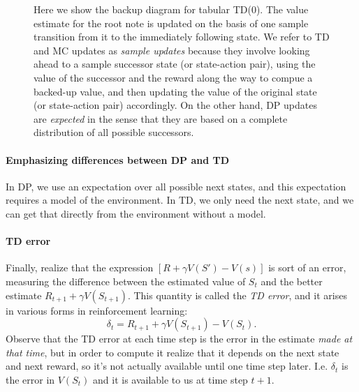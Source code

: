 \documentclass[12pt]{article}
\begin{document}
\begin{figure}[h]
  \centering
  \caption{\footnotesize Here we show the backup diagram for tabular TD(0). The value estimate for the root note is updated on the basis of one sample transition from it to the immediately following state. We refer to TD and MC updates as \emph{sample updates} because they involve looking ahead to a sample successor state (or state-action pair), using the value of the successor and the reward along the way to compue a backed-up value, and then updating the value of the original state (or state-action pair) accordingly. On the other hand, DP updates are \emph{expected} in the sense that they are based on a complete distribution of all possible successors.}
\end{figure}

\paragraph{Emphasizing differences between DP and TD}
In DP, we use an expectation over all possible next states, and this expectation requires a model of the environment. In TD, we only need the next state, and we can get that directly from the environment without a model.

\paragraph{TD error}
Finally, realize that the expression $\left[R + \gamma V(S') - V(s) \right]$ is sort of an error, measuring the difference between the estimated value of $S_t$ and the better estimate $R_{t+1} + \gamma V(S_{t+1})$. This quantity is called the \emph{TD error}, and it arises in various forms in reinforcement learning:
\begin{equation}
  \delta_t = R_{t+1} + \gamma V(S_{t+1}) - V(S_t).
\end{equation}
Observe that the TD error at each time step is the error in the estimate \emph{made at that time}, but in order to compute it realize that it depends on the next state and next reward, so it's not actually available until one time step later. I.e. $\delta_t$ is the error in $V(S_t)$ and it is available to us at time step $t+1$.
\end{document}
